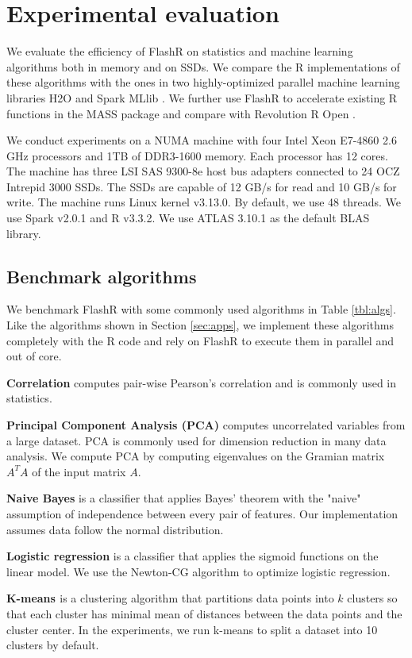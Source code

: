 \section{Experimental evaluation}
We evaluate the efficiency of FlashR on statistics and machine learning
algorithms both in memory and on SSDs. We compare the R implementations of
these algorithms with the ones in two highly-optimized parallel machine learning
libraries H2O \cite{h2o} and Spark MLlib \cite{mllib}. We further use FlashR
to accelerate existing R functions in the MASS package and compare with
Revolution R Open \cite{rro}.

We conduct experiments on a NUMA machine with
four Intel Xeon E7-4860 2.6 GHz processors and 1TB of 
DDR3-1600 memory. Each processor has 12 cores. The machine has three LSI SAS 9300-8e
host bus adapters connected to
24 OCZ Intrepid 3000 SSDs. The SSDs are capable of
12 GB/s for read and 10 GB/s for write. The machine runs
Linux kernel v3.13.0. By default, we use 48 threads. 
We use Spark v2.0.1 and R v3.3.2. We use ATLAS 3.10.1 as the default BLAS library.

\subsection{Benchmark algorithms}
We benchmark FlashR with some commonly used algorithms in Table
\ref{tbl:algs}. Like the algorithms shown in Section \ref{sec:apps},
we implement these algorithms completely with the R code and
rely on FlashR to execute them in parallel and out of core.

\noindent \textbf{Correlation} computes pair-wise Pearson's correlation
\cite{cor} and is commonly used in statistics.

\noindent \textbf{Principal Component Analysis (PCA)} computes uncorrelated
variables from a large dataset. PCA is commonly used for dimension reduction
in many data analysis. We compute PCA by computing eigenvalues on the Gramian
matrix $A^T A$ of the input matrix $A$.

\noindent \textbf{Naive Bayes} is a classifier that applies Bayes' theorem
with the "naive" assumption of independence between every pair of features.
Our implementation assumes data follow the normal distribution.

\noindent \textbf{Logistic regression} is a classifier that applies
the sigmoid functions on the linear model. We use the Newton-CG algorithm
to optimize logistic regression.

\noindent \textbf{K-means \cite{kmeans}} is a clustering algorithm that
partitions data points into $k$ clusters so that each cluster has minimal
mean of distances between the data points and the cluster center. 
In the experiments, we run k-means to split a dataset into 10 clusters
by default.

